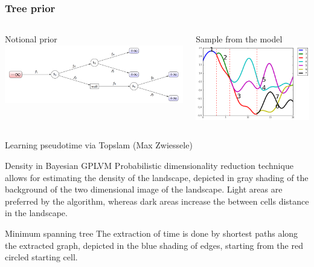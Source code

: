 \documentclass[ignorenonframetext]{beamer}
\begin{document}
\begin{frame}
\frametitle{Tree prior}
\begin{columns}
\begin{column}{0.7\textwidth} 
    \begin{center}
    Notional prior
     \includegraphics[width=1\textwidth]{branchingGPtreeSmallFL}      
     \end{center}
\end{column}

\begin{column}{0.55\textwidth} 
    \begin{center}
    Sample from the model
     \includegraphics[width=1\textwidth]{multibrachKernelSample}      
     \end{center}
\end{column}
\end{columns}
\end{frame}    

\begin{frame}{Learning pseudotime via Topslam (Max Zwiessele)}
\begin{block}{Density in Bayesian GPLVM}
Probabilistic dimensionality reduction technique allows for estimating the density of the landscape, depicted in gray shading of the background of the two dimensional image of the landscape.  Light areas are preferred by the algorithm, whereas dark areas increase the between cells distance in the landscape.
\end{block}

\begin{block}{Minimum spanning tree}
The extraction of time is done by shortest paths along the extracted graph, depicted in the blue shading of edges, starting from the red circled starting cell.
\end{block}
\end{frame}   
\end{document}
